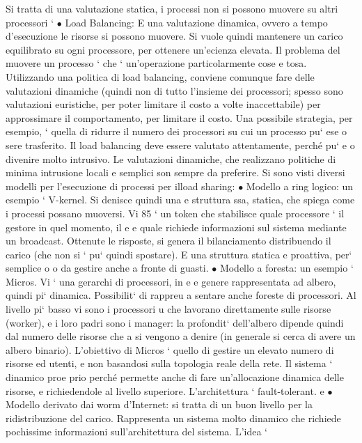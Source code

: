 \documentclass[a4paper,12pt]{article}
\begin{document}
Si tratta di una valutazione statica, i processi non si possono muovere su
altri processori
`
$\bullet$ Load Balancing: E una valutazione dinamica, ovvero a tempo d'esecuzione
le risorse si possono muovere. Si vuole quindi mantenere un carico equilibrato su ogni processore, per ottenere
un'ecienza elevata.
Il problema del muovere un processo ` che ` un'operazione particolarmente cose
e
tosa. Utilizzando una politica di load balancing, conviene comunque fare delle
valutazioni dinamiche (quindi non di tutto l'insieme dei processori; spesso sono
valutazioni euristiche, per poter limitare il costo a volte inaccettabile) per approssimare il comportamento, per
limitare il costo. Una possibile strategia, per
esempio, ` quella di ridurre il numero dei processori su cui un processo pu` ese
o
sere trasferito. Il load balancing deve essere valutato attentamente, perché pu`
e o
divenire molto intrusivo. Le valutazioni dinamiche, che realizzano politiche di
minima intrusione locali e semplici son sempre da preferire.
Si sono visti diversi modelli per l'esecuzione di processi per ilload sharing:
$\bullet$ Modello a ring logico: un esempio ` V-kernel. Si denisce quindi una
e
struttura ssa, statica, che spiega come i processi possano muoversi. Vi
85
\newpage
` un token che stabilisce quale processore ` il gestore in quel momento, il
e
e
quale richiede informazioni sul sistema mediante un broadcast. Ottenute
le risposte, si genera il bilanciamento distribuendo il carico (che non si
`
pu` quindi spostare). E una struttura statica e proattiva, per` semplice
o
o
da gestire anche a fronte di guasti.
$\bullet$ Modello a foresta: un esempio ` Micros. Vi ` una gerarchi di processori, in
e
e
genere rappresentata ad albero, quindi pi` dinamica. Possibilit` di rappreu
a
sentare anche foreste di processori. Al livello pi` basso vi sono i processori
u
che lavorano direttamente sulle risorse (worker), e i loro padri sono i manager: la profondit` dell'albero dipende
quindi dal numero delle risorse che
a
si vengono a denire (in generale si cerca di avere un albero binario). L'obiettivo di Micros ` quello di gestire un
elevato numero di risorse ed utenti,
e
non basandosi sulla topologia reale della rete. Il sistema ` dinamico proe
prio perché permette anche di fare un'allocazione dinamica delle risorse,
e
richiedendole al livello superiore. L'architettura ` fault-tolerant.
e
$\bullet$ Modello derivato dai worm d'Internet: si tratta di un buon livello per
la ridistribuzione del carico. Rappresenta un sistema molto dinamico che
richiede pochissime informazioni sull'architettura del sistema. L'idea `
\end{document}
